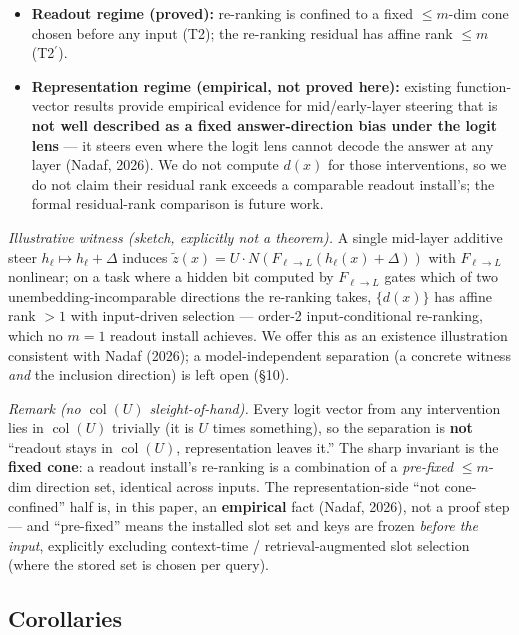 \documentclass[11pt]{article}
\theoremstyle{plain}
\theoremstyle{definition}
\begin{document}
\begin{itemize}
\item \textbf{Readout regime (proved):} re-ranking is confined to a fixed $\le m$-dim cone chosen before any input (T2); the re-ranking residual has affine rank $\le m$ (T2$^{\prime}$).
\item \textbf{Representation regime (empirical, not proved here):} existing function-vector results provide empirical evidence for mid/early-layer steering that is \textbf{not well described as a fixed answer-direction bias under the logit lens} --- it steers even where the logit lens cannot decode the answer at any layer (Nadaf, 2026). We do not compute $d(x)$ for those interventions, so we do not claim their residual rank exceeds a comparable readout install's; the formal residual-rank comparison is future work.
\end{itemize}

\emph{Illustrative witness (sketch, explicitly not a theorem).} A single mid-layer additive steer $h_\ell \mapsto h_\ell + \Delta$ induces $\tilde z(x) = U\cdot N(F_{\ell\to L}(h_\ell(x)+\Delta))$ with $F_{\ell\to L}$ nonlinear; on a task where a hidden bit computed by $F_{\ell\to L}$ gates which of two unembedding-incomparable directions the re-ranking takes, $\{d(x)\}$ has affine rank $> 1$ with input-driven selection --- order-2 input-conditional re-ranking, which no $m=1$ readout install achieves. We offer this as an existence illustration consistent with Nadaf (2026); a model-independent separation (a concrete witness \emph{and} the inclusion direction) is left open (\S10).

\emph{Remark (no $\operatorname{col}(U)$ sleight-of-hand).} Every logit vector from any intervention lies in $\operatorname{col}(U)$ trivially (it is $U$ times something), so the separation is \textbf{not} ``readout stays in $\operatorname{col}(U)$, representation leaves it.'' The sharp invariant is the \textbf{fixed cone}: a readout install's re-ranking is a combination of a \emph{pre-fixed} $\le m$-dim direction set, identical across inputs. The representation-side ``not cone-confined'' half is, in this paper, an \textbf{empirical} fact (Nadaf, 2026), not a proof step --- and ``pre-fixed'' means the installed slot set and keys are frozen \emph{before the input}, explicitly excluding context-time / retrieval-augmented slot selection (where the stored set is chosen per query).

\subsection{Corollaries}
\end{document}
